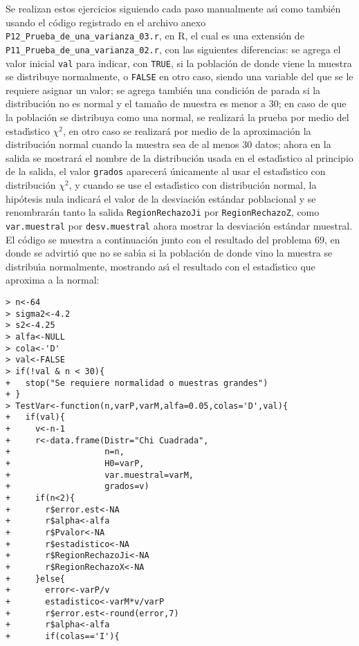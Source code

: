 \begin{solucion}
 Se realizan estos ejercicios siguiendo cada paso manualmente
 as\'{\i} como tambi\'en usando el c\'odigo registrado en el archivo anexo
 \texttt{P12\_Prueba\_de\_una\_varianza\_03.r}, en R,
 el cual es una extensi\'on de \texttt{P11\_Prueba\_de\_una\_varianza\_02.r},
 con las siguientes diferencias:
 se agrega el valor inicial \texttt{val} para indicar, con \texttt{TRUE},
 si la poblaci\'on de donde viene la muestra se distribuye normalmente,
 o \texttt{FALSE} en otro caso,
 siendo una variable del que se le requiere asignar un valor;
 se agrega tambi\'en una condici\'on de parada
 si la distribuci\'on no es normal y el tama\~no de muestra es menor a $30$;
 en caso de que la poblaci\'on se distribuya como una normal,
 se realizar\'a la prueba por medio del estad\'{\i}stico $\chi^2$,
 en otro caso se realizar\'a por medio de la aproximaci\'on
 la distribuci\'on normal cuando la muestra sea de al menos $30$ datos;
 ahora en la salida se mostrar\'a el nombre de la distribuci\'on usada
 en el estad\'{\i}stico al principio de la salida, el valor \texttt{grados} aparecer\'a \'unicamente al usar el estad\'{\i}stico
 con distribuci\'on $\chi^2$, y cuando se use el estad\'{\i}stico
 con distribuci\'on normal, la hip\'otesis nula indicar\'a el valor
 de la desviaci\'on est\'andar poblacional y se renombrar\'an
 tanto la salida \texttt{RegionRechazoJi} por \texttt{RegionRechazoZ},
 como \texttt{var.muestral} por \texttt{desv.muestral}
 ahora mostrar la desviaci\'on est\'andar muestral.
 El c\'odigo se muestra a continuaci\'on junto con el resultado
 del problema 69, en donde se advirti\'o que no se sab\'{\i}a
 si la poblaci\'on de donde vino la muestra se distribu\'{\i}a normalmente,
 mostrando as\'{\i} el resultado con el estad\'{\i}stico
 que aproxima a la normal:
 \begin{verbatim}
> n<-64
> sigma2<-4.2
> s2<-4.25
> alfa<-NULL
> cola<-'D'
> val<-FALSE
> if(!val & n < 30){
+   stop("Se requiere normalidad o muestras grandes")
+ }
> TestVar<-function(n,varP,varM,alfa=0.05,colas='D',val){
+   if(val){
+     v<-n-1
+     r<-data.frame(Distr="Chi Cuadrada",
+                   n=n,
+                   H0=varP,
+                   var.muestral=varM,
+                   grados=v)
+     if(n<2){
+       r$error.est<-NA
+       r$alpha<-alfa
+       r$Pvalor<-NA
+       r$estadistico<-NA
+       r$RegionRechazoJi<-NA
+       r$RegionRechazoX<-NA
+     }else{
+       error<-varP/v
+       estadistico<-varM*v/varP
+       r$error.est<-round(error,7)
+       r$alpha<-alfa
+       if(colas=='I'){

\end{verbatim}
\end{solucion}

